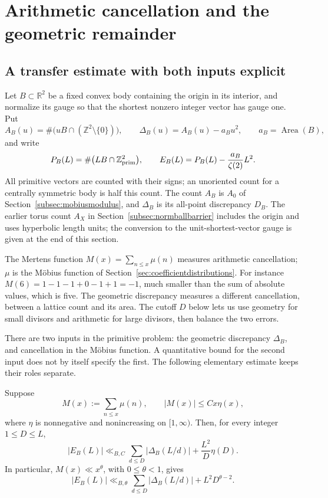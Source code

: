 \section{Arithmetic cancellation and the geometric remainder}
\label{sec:arithmeticgeometry}

\subsection{A transfer estimate with both inputs explicit}
\label{subsec:primitiveRHtransfer}

Let $B\subset\mathbb R^2$ be a fixed convex body containing the origin in
its interior, and normalize its gauge so that the shortest nonzero
integer vector has gauge one.  Put
\[
 A_B(u)=\#\bigl(uB\cap(\mathbb Z^2\setminus\{0\})\bigr),\qquad
 \Delta_B(u)=A_B(u)-a_Bu^2,\qquad a_B=\operatorname{Area}(B),
\]
and write
\[
 P_B(L)=\#\bigl(LB\cap\mathbb Z^2_{\rm prim}\bigr),\qquad
 E_B(L)=P_B(L)-\frac{a_B}{\zeta(2)}L^2.
\]
All primitive vectors are counted with their signs; an unoriented count
for a centrally symmetric body is half this count.
The count $A_B$ is $A_0$ of Section~\ref{subsec:mobiusmodulus},
and $\Delta_B$ is its all-point discrepancy $D_B$.
The earlier torus count $A_X$ in Section~\ref{subsec:normballbarrier}
includes the origin and uses hyperbolic length units; the conversion
to the unit-shortest-vector gauge is given at the end of this section.

The Mertens function $M(x)=\sum_{n\le x}\mu(n)$ measures
arithmetic cancellation; $\mu$ is the M\"obius function of
Section~\ref{sec:coefficientdistributions}. For instance
$M(6)=1-1-1+0-1+1=-1$, much smaller than the sum of absolute
values, which is five. The geometric discrepancy measures a
different cancellation, between a lattice count and its area.
The cutoff $D$ below lets us use geometry for small divisors and
arithmetic for large divisors, then balance the two errors.

There are two inputs in the primitive problem: the geometric discrepancy
$\Delta_B$, and cancellation in the M\"obius function.  A quantitative
bound for the second input does not by itself specify the first.  The
following elementary estimate keeps their roles separate.

\begin{proposition}
\label{prop:primitiveRHtransfer}
Suppose
\[
 M(x):=\sum_{n\le x}\mu(n),\qquad |M(x)|\le Cx\eta(x),
\]
where $\eta$ is nonnegative and nonincreasing on $[1,\infty)$.
Then, for every integer $1\le D\le L$,
\begin{equation}\label{eq:primitiveRHmaster}
 |E_B(L)|\ll_{B,C}
       \sum_{d\le D}|\Delta_B(L/d)|
       +\frac{L^2}{D}\eta(D).
\end{equation}
In particular, $M(x)\ll x^\theta$, with $0\le\theta<1$, gives
\begin{equation}\label{eq:primitiveRHpowerM}
 |E_B(L)|\ll_{B,\theta}
       \sum_{d\le D}|\Delta_B(L/d)|+L^2D^{\theta-2}.
\end{equation}
\end{proposition}

